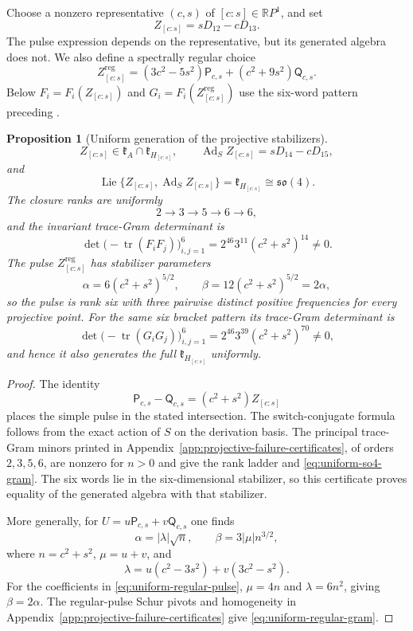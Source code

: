 \documentclass[11pt,a4paper]{article}
\newtheorem{proposition}[proposition]{Proposition}
\newcommand{\RR}{\mathbb R}
\newcommand{\Lie}{\operatorname{Lie}}
\newcommand{\Ad}{\operatorname{Ad}}
\begin{document}
Choose a nonzero representative $(c,s)$ of $[c:s]\in\RR P^1$, and set
\[
Z_{[c:s]}=sD_{12}-cD_{13}.
\]
The pulse expression depends on the representative, but its generated algebra does not.
We also define a spectrally regular choice
\begin{equation}
Z^{\mathrm{reg}}_{[c:s]}
 =(3c^2-5s^2)\mathsf P_{c,s}+(c^2+9s^2)\mathsf Q_{c,s}.
\label{eq:uniform-regular-pulse}
\end{equation}
Below $F_i=F_i(Z_{[c:s]})$ and $G_i=F_i(Z^{\mathrm{reg}}_{[c:s]})$
use the six-word pattern preceding .

\begin{proposition}[Uniform generation of the projective stabilizers]
\label{prop:uniform-so4}
\[
Z_{[c:s]}\in\mathfrak k_A\cap\mathfrak k_{H_{[c:s]}},
\qquad
\Ad_SZ_{[c:s]}=sD_{14}-cD_{15},
\]
and
\[
\Lie\{Z_{[c:s]},\Ad_SZ_{[c:s]}\}=\mathfrak k_{H_{[c:s]}}\cong\mathfrak{so}(4).
\]
The closure ranks are uniformly
\[
2\longrightarrow3\longrightarrow5\longrightarrow6\longrightarrow6,
\]
and the invariant trace-Gram determinant is
\begin{equation}
\det\bigl(-\operatorname{tr}(F_iF_j)\bigr)_{i,j=1}^6
=2^{46}3^{11}(c^2+s^2)^{14}\ne0.
\label{eq:uniform-so4-gram}
\end{equation}
The pulse $Z^{\mathrm{reg}}_{[c:s]}$ has stabilizer parameters
\[
\alpha=6(c^2+s^2)^{5/2},
\qquad
\beta=12(c^2+s^2)^{5/2}=2\alpha,
\]
so the pulse is rank six with three pairwise distinct positive frequencies for every projective point.  For the same six bracket pattern its trace-Gram determinant is
\begin{equation}
\det\bigl(-\operatorname{tr}(G_iG_j)\bigr)_{i,j=1}^6
=2^{46}3^{39}(c^2+s^2)^{70}\ne0,
\label{eq:uniform-regular-gram}
\end{equation}
and hence it also generates the full $\mathfrak k_{H_{[c:s]}}$ uniformly.
\end{proposition}

\begin{proof}
The identity
\[
\mathsf P_{c,s}-\mathsf Q_{c,s}=(c^2+s^2)Z_{[c:s]}
\]
places the simple pulse in the stated intersection.  The switch-conjugate formula follows from the exact action of $S$ on the derivation basis.  The principal trace-Gram minors printed in Appendix~\ref{app:projective-failure-certificates}, of orders $2,3,5,6$, are nonzero for $n>0$ and give the rank ladder and \eqref{eq:uniform-so4-gram}.  The six words lie in the six-dimensional stabilizer, so this certificate proves equality of the generated algebra with that stabilizer.

More generally, for $U=u\mathsf P_{c,s}+v\mathsf Q_{c,s}$ one finds
\[
\alpha=|\lambda|\sqrt n,
\qquad
\beta=3|\mu|n^{3/2},
\]
where $n=c^2+s^2$, $\mu=u+v$, and
\[
\lambda=u(c^2-3s^2)+v(3c^2-s^2).
\]
For the coefficients in \eqref{eq:uniform-regular-pulse}, $\mu=4n$ and $\lambda=6n^2$, giving $\beta=2\alpha$.  The regular-pulse Schur pivots and homogeneity in Appendix~\ref{app:projective-failure-certificates} give \eqref{eq:uniform-regular-gram}.
\end{proof}
\end{document}

